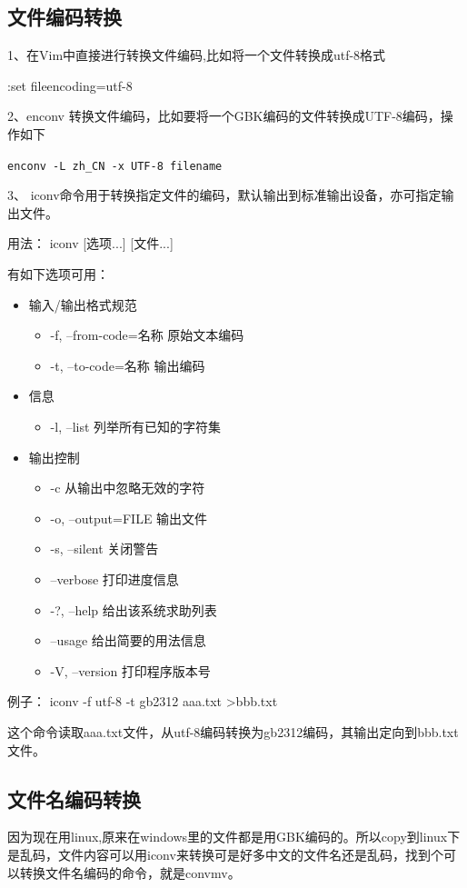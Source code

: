 {\subsection{文件编码转换}
1、在Vim中直接进行转换文件编码,比如将一个文件转换成utf-8格式

:set fileencoding=utf-8

2、enconv 转换文件编码，比如要将一个GBK编码的文件转换成UTF-8编码，操作如下

\verb|enconv -L zh_CN -x UTF-8 filename|

3、 iconv命令用于转换指定文件的编码，默认输出到标准输出设备，亦可指定输出文件。  

用法： iconv [选项...] [文件...]  

有如下选项可用：
\begin{itemize}
\item 输入/输出格式规范
	\begin{itemize}
	\item  -f, --from-code=名称 原始文本编码  
	\item -t, --to-code=名称 输出编码  
	\end{itemize}
\item 信息
	\begin{itemize}
	\item  -l, --list 列举所有已知的字符集    
	\end{itemize}
\item 输出控制
	\begin{itemize}
	\item  -c 从输出中忽略无效的字符  
	\item -o, --output=FILE 输出文件  
	\item -s, --silent 关闭警告  
	\item --verbose 打印进度信息  
	\item -?, --help 给出该系统求助列表  
	\item --usage 给出简要的用法信息  
	\item -V, --version 打印程序版本号   
	\end{itemize}
\end{itemize}  

例子： iconv -f utf-8 -t gb2312 aaa.txt >bbb.txt 

 这个命令读取aaa.txt文件，从utf-8编码转换为gb2312编码，其输出定向到bbb.txt文件。

 
\subsection{文件名编码转换}
因为现在用linux,原来在windows里的文件都是用GBK编码的。所以copy到linux下是乱码，文件内容可以用iconv来转换可是好多中文的文件名还是乱码，找到个可以转换文件名编码的命令，就是convmv。

}
